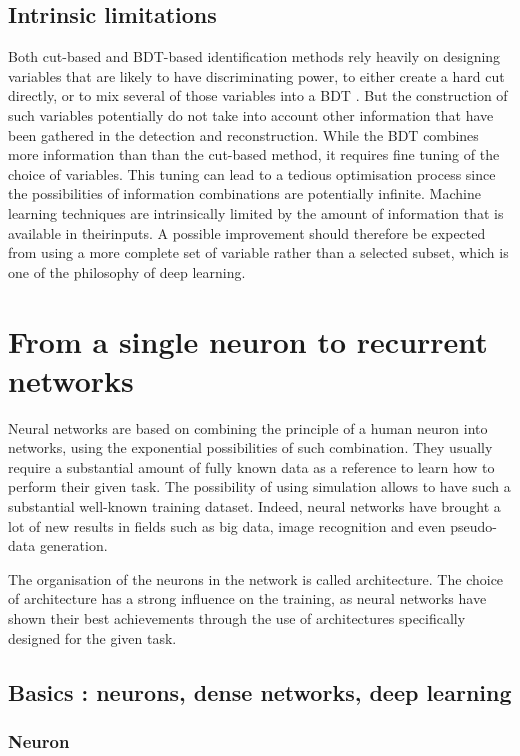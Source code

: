 \subsection{Intrinsic limitations}

Both cut-based and BDT-based identification methods rely heavily on designing variables that are likely to have discriminating power, to either create a hard cut directly, or to mix several of those variables into a BDT . But the construction of such variables potentially do not take into account other information that have been gathered in the detection and reconstruction.
While the BDT combines more information than than the cut-based method, it requires fine tuning of the choice of variables. This tuning can lead to a tedious optimisation process since the possibilities of information combinations are potentially infinite. Machine learning techniques are intrinsically limited by the amount of information that is available in theirinputs. 
A possible improvement should therefore be expected from using a more complete set of variable rather than a selected subset, which is one of the philosophy of deep learning.


\section{From a single neuron to recurrent networks}
\label{sec:NN}
Neural networks are based on combining the principle of a human neuron into networks, using the exponential possibilities of such combination.
They usually require a substantial amount of fully known data as a reference to learn how to perform their given task. The possibility of using simulation allows to have such a substantial  well-known training dataset.
Indeed, neural networks have brought a lot of new results in fields such as big data, image recognition and even pseudo-data generation.

The organisation of the neurons in the network is called architecture. The choice of architecture has a strong influence on the training, as neural networks have shown their best achievements through the use of architectures specifically designed for the given task.

\subsection{Basics : neurons, dense networks, deep learning}

\subsubsection{Neuron}

